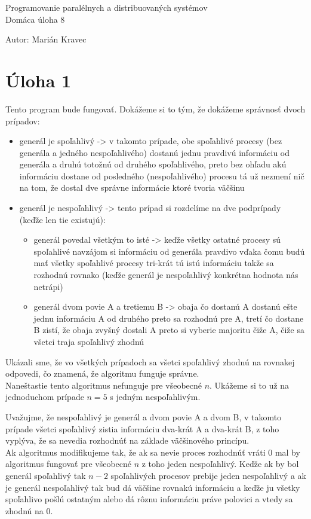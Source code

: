 \documentclass[a4paper]{article}
\begin{document}
 
	
\pagestyle{plain}

\begin{center}
	\sc\large
	Programovanie paralélnych a distribuovaných systémov\\
	Domáca úloha 8
\end{center}

Autor: Marián Kravec

\section{Úloha 1}

Tento program bude fungovať. Dokážeme si to tým, že dokážeme správnosť dvoch prípadov:

\begin{itemize}
	\item generál je spoľahlivý -> v takomto prípade, obe spoľahlivé procesy (bez generála a jedného nespoľahlivého) dostanú jednu pravdivú informáciu od generála a druhú totožnú od druhého spoľahlivého, preto bez ohľadu akú informáciu dostane od posledného (nespoľahlivého) procesu tá už nezmení nič na tom, že dostal dve správne informácie ktoré tvoria väčšinu
	\item generál je nespoľahlivý -> tento prípad si rozdelíme na dve podprípady (keďže len tie existujú):
	\begin{itemize}
		\item generál povedal všetkým to isté -> keďže všetky ostatné procesy sú spoľahlivé navzájom si informáciu od generála pravdivo vďaka čomu budú mať všetky spoľahlivé procesy tri-krát tú istú informáciu takže sa rozhodnú rovnako (keďže generál je nespoľahlivý konkrétna hodnota nás netrápi)
		\item generál dvom povie A a tretiemu B -> obaja čo dostanú A dostanú ešte jednu informáciu A od druhého preto sa rozhodnú pre A, tretí čo dostane B zistí, že obaja zvyšný dostali A preto si vyberie majoritu čiže A, čiže sa všetci traja spoľahlivý zhodnú
	\end{itemize}
\end{itemize}

Ukázali sme, že vo všetkých prípadoch sa všetci spoľahlivý zhodnú na rovnakej odpovedi, čo znamená, že algoritmu funguje správne.
\\

Naneštastie tento algoritmus nefunguje pre všeobecné $n$. Ukážeme si to už na jednoduchom prípade $n=5$ s jedným nespoľahlivým.

Uvažujme, že nespoľahlivý je generál a dvom povie A a dvom B, v takomto prípade všetci spoľahlivý zistia informáciu dva-krát A a dva-krát B, z toho vyplýva, že sa nevedia rozhodnúť na základe väčšinového princípu. 
\\

Ak algoritmus modifikujeme tak, že ak sa nevie proces rozhodnúť vráti 0 mal by algoritmus fungovať pre všeobecné $n$ z toho jeden nespoľahlivý. Keďže ak by bol generál spoľahlivý tak $n-2$ spoľahlivých procesov prebije jeden nespoľahlivý a ak je generál nespoľahlivý tak bud dá väčšine rovnakú informáciu a keďže ju všetky spoľahlivo pošlú ostatným alebo dá rôznu informáciu práve polovici a vtedy sa zhodnú na 0.
\end{document}
